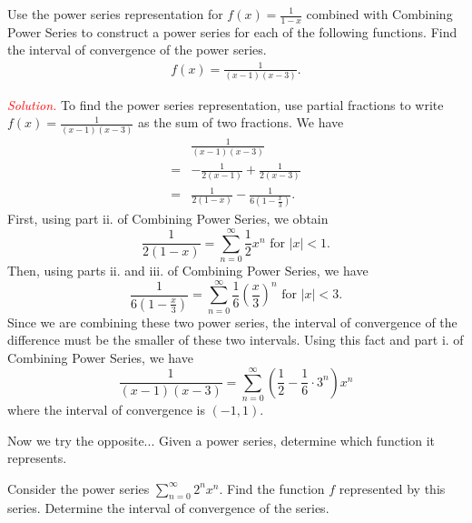 \documentclass{report}
\begin{document}
    \bigbreak \noindent 
    \begin{exm}
        Use the power series representation for \( f(x) = \frac{1}{1 - x} \) combined with Combining Power Series to construct a power series for each of the following functions. Find the interval of convergence of the power series.
        \begin{align*}
            f(x)  =\frac{1}{(x-1)(x-3)}
        .\end{align*}
    \end{exm}
    \bigbreak \noindent 
    \textcolor{red}{\textit{Solution.}}
    To find the power series representation, use partial fractions to write \( f(x) = \frac{1}{(x-1)(x-3)} \) as the sum of two fractions. We have
    \begin{align*}
        &\frac{1}{(x-1)(x-3)}  \\
        =&-\frac{1}{2(x-1)} + \frac{1}{2(x-3)} \\
        =&\frac{1}{2(1-x)} - \frac{1}{6(1-\frac{x}{3})}
    .\end{align*}
    First, using part ii. of Combining Power Series, we obtain
    \[
    \frac{1}{2(1-x)} = \sum_{n=0}^{\infty} \frac{1}{2} x^n \text{ for } |x| < 1.
    \]
    Then, using parts ii. and iii. of Combining Power Series, we have
    \[
    \frac{1}{6(1-\frac{x}{3})} = \sum_{n=0}^{\infty} \frac{1}{6} \left(\frac{x}{3}\right)^n \text{ for } |x| < 3.
    \]
    Since we are combining these two power series, the interval of convergence of the difference must be the smaller of these two intervals. Using this fact and part i. of Combining Power Series, we have
    \[
    \frac{1}{(x-1)(x-3)} = \sum_{n=0}^{\infty} \left(\frac{1}{2} - \frac{1}{6} \cdot 3^n\right) x^n
    \]
    where the interval of convergence is \((-1,1)\).

    \bigbreak \noindent 
    Now we try the opposite... Given a power series, determine which function it represents.
    \bigbreak \noindent 
    \begin{exm}
        Consider the power series \(\sum_{n=0}^{\infty} 2^n x^n\). Find the function \( f \) represented by this series. Determine the interval of convergence of the series.
    \end{exm}

    \bigbreak \noindent 
\end{document}
